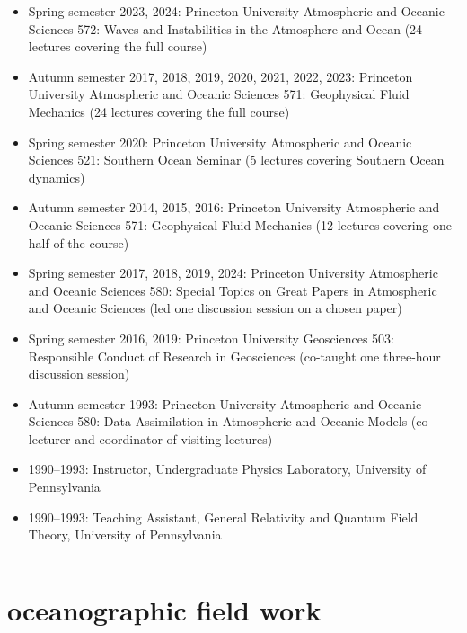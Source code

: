 \documentclass{article}
\begin{document}
\begin{itemize}[leftmargin=*]

\item Spring semester 2023, 2024: Princeton University Atmospheric and Oceanic Sciences 572: Waves and Instabilities in the Atmosphere and Ocean (24 lectures covering the full course)

\item Autumn semester 2017, 2018, 2019, 2020, 2021, 2022, 2023: Princeton University Atmospheric and Oceanic Sciences 571: Geophysical Fluid Mechanics (24 lectures covering the full course)

\item Spring semester 2020: Princeton University Atmospheric and Oceanic Sciences 521: Southern Ocean Seminar (5 lectures covering Southern Ocean dynamics)

\item Autumn semester 2014, 2015, 2016: Princeton University Atmospheric and Oceanic Sciences 571: Geophysical Fluid Mechanics (12 lectures covering one-half of the course)

\item Spring semester 2017, 2018, 2019, 2024: Princeton University Atmospheric and Oceanic Sciences 580: Special Topics on Great Papers in Atmospheric and Oceanic Sciences (led one discussion session on a chosen paper)

\item Spring semester 2016, 2019: Princeton University Geosciences 503: Responsible Conduct of Research in Geosciences (co-taught one three-hour discussion session)

\item Autumn semester 1993: Princeton University Atmospheric and Oceanic Sciences 580: Data Assimilation in Atmospheric and Oceanic Models (co-lecturer and coordinator of visiting lectures)

\item 1990--1993:  Instructor, Undergraduate Physics Laboratory, University of Pennsylvania 

\item 1990--1993:  Teaching Assistant,  General Relativity and Quantum Field Theory, University of Pennsylvania 

\end{itemize}

\noindent\rule{\textwidth}{1pt}
\vspace{-1cm}
\section*{\sc \color{Maroon}  oceanographic field work}
\vspace{-.25cm}
\end{document}
